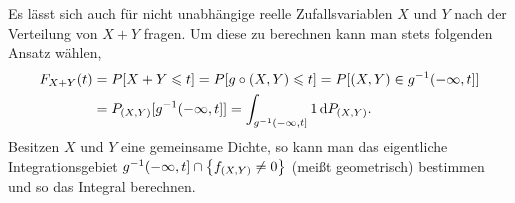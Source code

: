 Es lässt sich auch für nicht unabhängige reelle Zufallsvariablen $X$ und $Y$
nach der Verteilung von $X+Y$ fragen. Um diese zu berechnen kann man stets
folgenden Ansatz wählen,
\begin{align*}
F_{X+Y}(t) &= P[X+Y\leqslant t] = P[g\circ (X,Y)\leqslant t] = P[(X,Y)\in
g^{-1}(-\infty,t]]\\
&= P_{(X,Y)}[g^{-1}(-\infty,t]] = \int_{g^{-1}(-\infty,t]} 1 \,\mathrm{d} P_{(X,Y)}.
\end{align*}
Besitzen $X$ und $Y$ eine gemeinsame Dichte, so kann man das
eigentliche Integrationsgebiet $g^{-1}(-\infty,t]\cap \left\{ f_{(X,Y)}\neq 0 \right\}$
(meißt geometrisch) bestimmen und so das Integral berechnen.